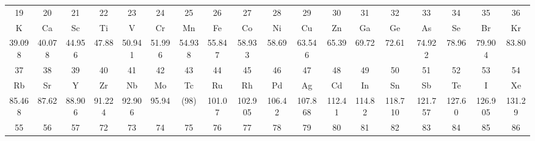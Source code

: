 \documentclass[10pt,landscape]{book}
\begin{document}
\begin{center}
\begin{tabular}{|c*{16}{|c}|c|}
        \small 19      & \small 20      & \small 21      & \small 22     & \small 23      & \small 24     & \small 25      & \small 26     & \small 27      & \small 28     & \small 29      & \small 30     & \small 31      & \small 32      & \small 33      & \small 34     & \small 35      & \small 36                         \\
        K              & Ca             & Sc             & Ti            & V              & Cr            & Mn             & Fe            & Co             & Ni            & Cu             & Zn            & Ga             & Ge             & As             & Se            & Br             & Kr                                \\[-2mm]
        \small 39.098  & \small 40.078  & \small 44.956  & \small 47.88  & \small 50.941  & \small 51.996 & \small 54.938  & \small 55.847 & \small 58.933  & \small 58.69  & \small 63.546  & \small 65.39  & \small 69.72   & \small 72.61   & \small 74.922  & \small 78.96  & \small 79.904  & \small 83.80                      \\[-1mm]
        \hline
        \small 37      & \small 38      & \small 39      & \small 40     & \small 41      & \small 42     & \small 43      & \small 44     & \small 45      & \small 46     & \small 47      & \small 48     & \small 49      & \small 50      & \small 51      & \small 52     & \small 53      & \small 54                         \\[-1mm]
        Rb             & Sr             & Y              & Zr            & Nb             & Mo            & Tc             & Ru            & Rh             & Pd            & Ag             & Cd            & In             & Sn             & Sb             & Te            & I              & Xe                                \\[-2mm]
        \small 85.468  & \small 87.62   & \small 88.906  & \small 91.224 & \small 92.906  & \small 95.94  & \small (98)    & \small 101.07 & \small 102.905 & \small 106.42 & \small 107.868 & \small 112.41 & \small 114.82  & \small 118.710 & \small 121.757 & \small 127.60 & \small 126.905 & \small 131.29                     \\[-1mm]
        \hline
        \small 55      & \small 56      & \small 57      & \small 72     & \small 73      & \small 74     & \small 75      & \small 76     & \small 77      & \small 78     & \small 79      & \small 80     & \small 81      & \small 82      & \small 83      & \small 84     & \small 85      & \small 86                         \\[-1mm]

\end{tabular}
\end{center}
\end{document}
